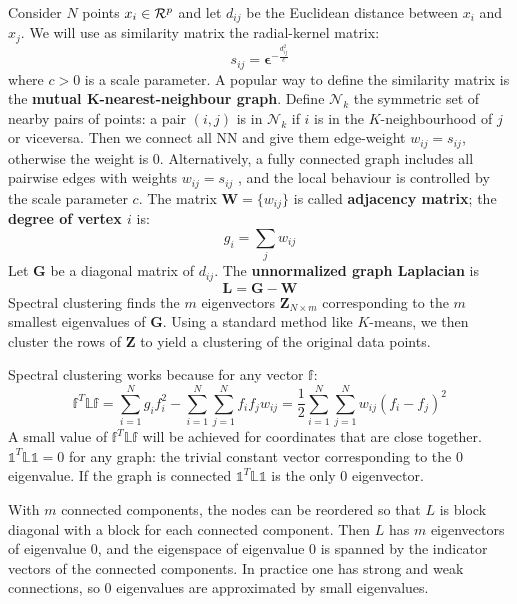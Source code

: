 \documentclass[12pt, letterpaper]{article}
\theoremstyle{definition}
\newcommand{\e}{\mathbf{\epsilon}}
\begin{document}
Consider $N$ points $x_i \in \CMcal{R}^p$ and let $d_{ij}$ be the Euclidean distance between $x_i$ and $x_j$. We will use as similarity matrix the radial-kernel matrix:
\begin{equation}
s_{ij} = \e^{-\frac{d_{ij}^2}{c}}
\end{equation}
where $c >0$ is a scale parameter. A popular way to define the similarity matrix is the \textbf{mutual K-nearest-neighbour graph}. Define $\mathcal{N}_k$ the symmetric set of nearby pairs of points: a pair $(i,j)$ is in $\mathcal{N}_k$ if $i$ is in the $K$-neighbourhood of $j$ or viceversa. Then we connect all NN and give them edge-weight $w_{ij} = s_{ij}$, otherwise the weight is $0$.
Alternatively, a fully connected graph includes all pairwise edges with weights $w_{ij} = s_{ij}$ , and the local behaviour is controlled by the scale parameter $c$.
The matrix $\mathbf{W} = \{w_{ij}\}$ is called \textbf{adjacency matrix}; the \textbf{degree of vertex $i$} is:
\begin{equation}
g_i = \sum_j w_{ij}
\end{equation}
Let $\mathbf{G}$ be a diagonal matrix of $d_{ij}$. The \textbf{unnormalized graph Laplacian} is
\begin{equation}
\mathbf{L} = \mathbf{G} -\mathbf{W}
\end{equation}
Spectral clustering finds the $m$ eigenvectors $\mathbf{Z}_{N\times m}$ corresponding to the $m$ smallest eigenvalues of $\mathbf{G}$.  Using a standard method like $K$-means, we then cluster the rows of $\mathbf{Z}$ to yield a clustering of the original data points.

Spectral clustering works because for any vector $\mathbb{f}$:
\begin{equation}
\mathbb{f}^T\mathbb{Lf}= \sum_{i=1}^Ng_i f_i^2 -\sum_{i=1}^N\sum_{j=1}^N f_i f_j w_{ij} = \frac{1}{2}\sum_{i=1}^N\sum_{j=1}^N  w_{ij}(f_i -f_j)^2 
\end{equation}
A small value of $\mathbb{f}^T\mathbb{Lf}$ will be achieved for coordinates that are close together.
$\mathbb{1}^T\mathbb{L1}=0$ for any graph: the trivial constant vector corresponding to the $0$ eigenvalue. If the graph is connected $\mathbb{1}^T\mathbb{L1}$ is the only $0$ eigenvector.

With $m$ connected components, the nodes can be reordered so that $L$ is block diagonal with a block for each connected component. Then $L$ has $m$ eigenvectors of eigenvalue $0$, and the eigenspace of eigenvalue $0$ is spanned by the indicator vectors of the connected components. In practice one has strong and weak connections, so $0$ eigenvalues are approximated by small eigenvalues.
\end{document}
